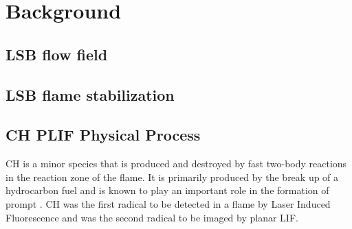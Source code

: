 \chapter{Background}






\section{LSB flow field}

\section{LSB flame stabilization}

\section{CH PLIF Physical Process}

CH is a minor species that is produced and destroyed by fast two-body reactions in the reaction zone of the flame.
It is primarily produced by the break up of a hydrocarbon fuel and is known to play an important role in the formation of prompt .
CH was the first radical to be detected in a flame by Laser Induced Fluorescence and was the second radical to be imaged by planar LIF.


